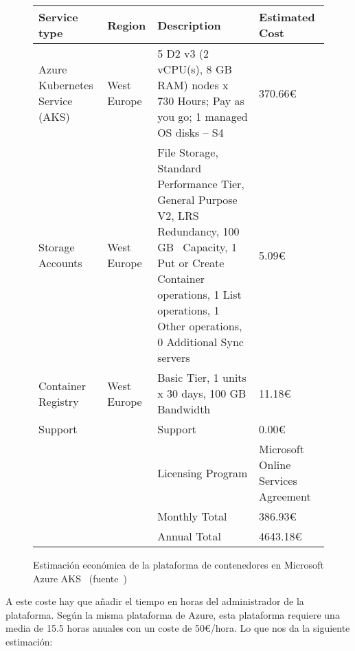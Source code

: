 \begin{figure}[!ht]
  \centering
  \begin{tabular}{|p{}|p{}|p{}|p{}|}
  \hline
  {\bf Service type}              & {\bf Region}  & {\bf Description}                                                                           & {\bf Estimated Cost}                \\
  \hline
  Azure Kubernetes Service (AKS)  & West Europe   & 5 D2 v3 (2 vCPU(s), 8 GB RAM) nodes x 730 Hours; Pay as you go; 1 managed OS disks – S4     & 370.66€                             \\
  \hline
  Storage Accounts                & West Europe   & File Storage, Standard Performance Tier, General Purpose V2, LRS Redundancy, 100 GB \
                          Capacity, 1 Put or Create Container operations, 1 List operations, 1 Other operations, 0 Additional Sync servers      & 5.09€                               \\
  \hline
  Container Registry              & West Europe   & Basic Tier, 1 units x 30 days, 100 GB Bandwidth                                             & 11.18€                              \\
  \hline
  Support                         &               & Support                                                                                     & 0.00€                               \\
  \hline
                                  &               & Licensing Program                                                                           & Microsoft Online Services Agreement \\
  \hline
                                  &               & Monthly Total                                                                               & 386.93€                             \\
  \hline
                                  &               & Annual Total                                                                                & 4643.18€                            \\
  \hline
  \end{tabular}
  \label{tabla:azurecalculatoraks}
  \caption{Estimación económica de la plataforma de contenedores en Microsoft Azure AKS~\cite{aks} (fuente~\cite{azurecalculator})}
\end{figure}

\par A este coste hay que añadir el tiempo en horas del administrador de la plataforma. Según la misma plataforma de Azure, esta plataforma requiere una media de 15.5 horas anuales con un coste de 50€/hora. Lo que nos da
la siguiente estimación:

